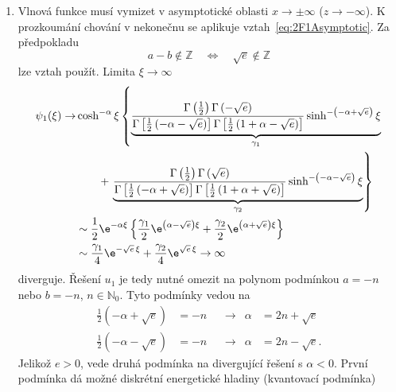 \begin{solution}
\begin{enumerate}
    \item
        Vlnová funkce musí vymizet v asymptotické oblasti $x\rightarrow\pm\infty$ ($z\rightarrow-\infty$).
        K prozkoumání chování v nekonečnu se aplikuje vztah~\eqref{eq:2F1Asymptotic}.
        Za předpokladu
        \begin{equation}
            a-b\notin\mathbb{Z}\quad\Leftrightarrow\quad\sqrt{e}\notin\mathbb{Z}
        \end{equation}
        lze vztah použít.
        Limita $\xi\rightarrow\infty$
        \begin{align}
            \psi_{1}(\xi)\rightarrow
                &\cosh^{-\alpha}\xi\left\{
                    \underbrace{\frac{\Gamma\left(\frac{1}{2}\right)\Gamma\left(-\sqrt{e}\right)}{\Gamma\left[\frac{1}{2}\left(-\alpha-\sqrt{e}\right)\right]\Gamma\left[\frac{1}{2}\left(1+\alpha-\sqrt{e}\right)\right]}\sinh^{-\left(-\alpha+\sqrt{e}\right)}\xi}_{\gamma_{1}}\right.\nonumber\\
                &\qquad+\left.\underbrace{\frac{\Gamma\left(\frac{1}{2}\right)\Gamma\left(\sqrt{e}\right)}{\Gamma\left[\frac{1}{2}\left(-\alpha+\sqrt{e}\right)\right]\Gamma\left[\frac{1}{2}\left(1+\alpha+\sqrt{e}\right)\right]}\sinh^{-\left(-\alpha-\sqrt{e}\right)}\xi}_{\gamma_{2}}\right\}\nonumber\\
                &\sim\frac{1}{2}\e^{-\alpha\xi}\left\{\frac{\gamma_{1}}{2}\e^{\left(\alpha-\sqrt{e}\right)\xi}
                +\frac{\gamma_{2}}{2}\e^{\left(\alpha+\sqrt{e}\right)\xi}\right\}\nonumber\\
                &\sim\frac{\gamma_{1}}{4}\e^{-\sqrt{e}\,\xi}+\frac{\gamma_{2}}{4}\e^{\sqrt{e}\,\xi}\rightarrow\infty
        \end{align}
        diverguje.
        Řešení $u_{1}$ je tedy nutné omezit na polynom podmínkou $a=-n$ nebo $b=-n$, $n\in\mathbb{N}_{0}$.
        Tyto podmínky vedou na
        \begin{subequations}
            \begin{align}
                \frac{1}{2}\left(-\alpha+\sqrt{e}\right)&=-n &&\longrightarrow &\alpha&=2n+\sqrt{e} \\
                \frac{1}{2}\left(-\alpha-\sqrt{e}\right)&=-n &&\longrightarrow &\alpha&=2n-\sqrt{e}.
            \end{align}                
        \end{subequations}
        Jelikož $e>0$, vede druhá podmínka na divergující řešení s $\alpha<0$.
        První podmínka dá možné diskrétní energetické hladiny (kvantovací podmínka)

\end{enumerate}
\end{solution}
